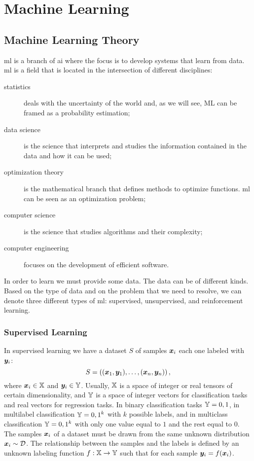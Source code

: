 \chapter{Machine Learning}
\section{Machine Learning Theory}
\ac{ml} is a branch of \ac{ai}
where the focus is to develop systems that learn from data. \ac{ml} is
a field that is located in the intersection 
of different disciplines:
\begin{description}
\item[statistics] deals with the uncertainty of the world and, as we
  will see, ML can be framed as a probability estimation;
\item[data science] is the science that interprets and studies the
  information contained in the data and how it can be used;
\item[optimization theory] is the mathematical branch that defines
  methods to optimize functions. \ac{ml} can be seen as an optimization
  problem;
\item[computer science] is the science that studies algorithms and
  their complexity;
\item[computer engineering] focuses on the development of efficient
  software.
\end{description}

In order to learn we must provide some data. The data can be of
different kinds. Based
on the type of data and on the problem that we need to resolve, we can denote
three different types of \ac{ml}: supervised, 
unsupervised, and reinforcement learning.

\subsection{Supervised Learning}\label{sec:supervisedTheory}
In supervised learning we have a dataset $S$ of samples $\bm{x}_i$
each one labeled with $\bm{y}_i$:
\begin{equation*}
  S=\left((\bm{x}_1,\bm{y}_1),\dots,(\bm{x}_n,\bm{y}_n)\right),
\end{equation*}
where $\bm{x}_i\in\mathbb{X}$ and $\bm{y}_i\in\mathbb{Y}$. Usually, $\mathbb{X}$
is a space of integer or real 
tensors of certain dimensionality, and $\mathbb{Y}$ is a space of integer
vectors for classification tasks and real vectors for regression
tasks. In binary classification tasks $\mathbb{Y}={0,1}$, in multilabel
classification $\mathbb{Y}={0,1}^k$ with $k$ possible labels, and in
multiclass classification $\mathbb{Y}={0,1}^k$ with only one value equal to
$1$ and the rest equal to $0$. The samples $\bm{x}_i$ of a dataset must be
drawn from the same unknown distribution $\bm{x}_i\sim\mathcal{D}$. The
relationship between the samples and the labels is defined by an unknown
labeling function $f:\mathbb{X}\rightarrow\mathbb{Y}$ such that for each sample
$\bm{y}_i=f(\bm{x}_i)$.

